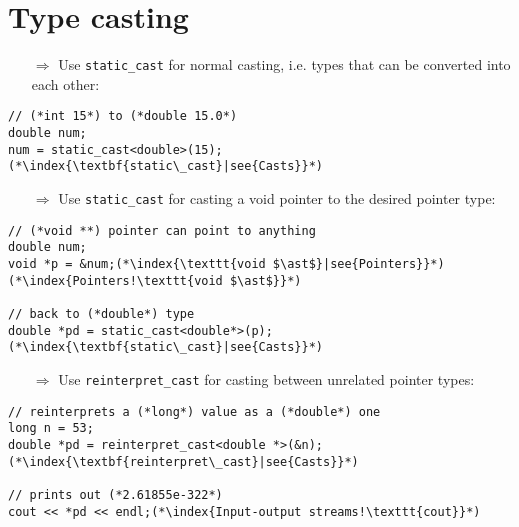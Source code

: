 \documentclass[10pt]{article}
\begin{document}
\section{Type casting}
\small
\begin{enumerate}
\item[$\Rightarrow$] Use \texttt{static\_cast} for normal casting, i.e. types that can be converted into each other:
\end{enumerate}
\begin{lstlisting}
// (*int 15*) to (*double 15.0*)
double num;
num = static_cast<double>(15);(*\index{\textbf{static\_cast}|see{Casts}}*)
\end{lstlisting}
\begin{enumerate}
\item[$\Rightarrow$] Use \texttt{static\_cast} for casting a void pointer to the desired pointer type:
\end{enumerate}
\begin{lstlisting}
// (*void **) pointer can point to anything
double num;
void *p = &num;(*\index{\texttt{void $\ast$}|see{Pointers}}*)(*\index{Pointers!\texttt{void $\ast$}}*) 

// back to (*double*) type
double *pd = static_cast<double*>(p);(*\index{\textbf{static\_cast}|see{Casts}}*)
\end{lstlisting}
\begin{enumerate}
\item[$\Rightarrow$] Use \texttt{reinterpret\_cast} for casting between unrelated pointer types:
\end{enumerate}
\begin{lstlisting}
// reinterprets a (*long*) value as a (*double*) one
long n = 53;
double *pd = reinterpret_cast<double *>(&n);(*\index{\textbf{reinterpret\_cast}|see{Casts}}*)

// prints out (*2.61855e-322*)
cout << *pd << endl;(*\index{Input-output streams!\texttt{cout}}*)

\end{lstlisting}
%
%
\end{document}
